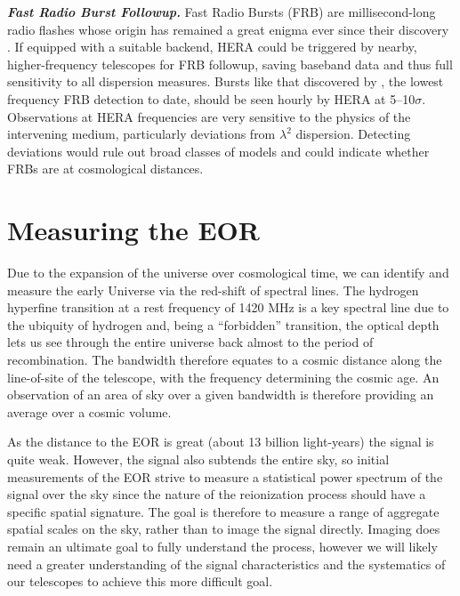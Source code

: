 \documentclass[preprint,11pt]{aastex}
\begin{document}
\textbf{\emph{Fast Radio Burst Followup.}}
\label{sec:FRBs}
Fast Radio Bursts (FRB) are millisecond-long radio flashes whose origin has remained a great enigma ever since their discovery \citep{2007Sci...318..777L}. 
If equipped with a suitable backend, HERA could be triggered by nearby, higher-frequency telescopes for FRB followup, saving baseband data and thus full sensitivity to all dispersion measures.
Bursts like that discovered by \citet{masui_et_al2015}, the lowest frequency
FRB detection to date, should be seen hourly by HERA at 5--10$\sigma$. %
 Observations at HERA frequencies are very sensitive to the physics of
the intervening medium, particularly deviations from $\lambda^2$
dispersion. Detecting deviations would rule out broad classes of models and could indicate whether FRBs are at cosmological distances.

\section{Measuring the EOR}
\label{sec:eormeas}
Due to the expansion of the universe over cosmological time, we can identify and measure the early Universe via the red-shift of spectral lines.  The hydrogen hyperfine transition at a rest frequency of 1420 MHz is a key spectral line due to the ubiquity of hydrogen and, being a ``forbidden'' transition, the optical depth lets us see through the entire universe back almost to the period of recombination.  The bandwidth
therefore equates to a cosmic distance along the line-of-site of the telescope, with the frequency determining the cosmic age.  An observation of an area of sky over a given bandwidth is therefore providing an average
over a cosmic volume.

As the distance to the EOR is great (about 13 billion light-years) the signal is quite weak.  However, the signal also subtends the entire sky, so initial measurements of the EOR strive to measure a statistical power spectrum of the signal over the sky since the nature of the reionization process should have a specific spatial signature.  The goal is therefore to measure a range of aggregate spatial scales on the sky, rather than to image the signal directly.  Imaging does remain an ultimate goal to fully understand the process, however we will likely need a greater understanding of the signal characteristics and the systematics of our telescopes to achieve this more difficult goal.  
\end{document}
